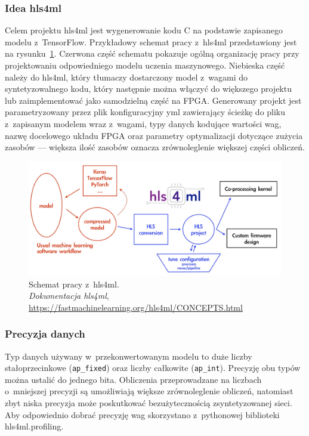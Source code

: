 \documentclass[12pt, oneside, a4paper]{article}
\def\CPP{{C\nolinebreak[4]\hspace{-.05em}\raisebox{.4ex}{\tiny\bf ++}}}
\begin{document}
\subsubsection{Idea hls4ml}
Celem projektu hls4ml jest wygenerowanie kodu \CPP{} na podstawie zapisanego
modelu z~TensorFlow. Przykładowy schemat pracy z~hls4ml przedstawiony jest
na rysunku~\ref{fig:hls4ml}.
Czerwona część schematu pokazuje ogólną organizację pracy przy projektowaniu 
odpowiedniego modelu uczenia maszynowego. Niebieska część należy do hls4ml,
który tłumaczy dostarczony model z~wagami do syntetyzowalnego kodu, który
następnie można włączyć do większego projektu lub zaimplementować jako
samodzielną część na FPGA. Generowany projekt jest parametryzowany
przez plik konfiguracyjny yml zawierający ścieżkę do pliku z~zapisanym modelem
wraz z~wagami, typy danych kodujące wartości wag, nazwę docelowego układu FPGA
oraz parametry optymalizacji dotyczące zużycia zasobów --- większa ilość
zasobów oznacza zrównoleglenie większej części obliczeń.
\begin{figure}[h]
  \centering
  \includegraphics[width=\linewidth]{figures/hls4ml.jpg}
  \caption{Schemat pracy z~hls4ml. \\
  \textit{Dokumentacja hls4ml},
  \url{https://fastmachinelearning.org/hls4ml/CONCEPTS.html}}\label{fig:hls4ml}
\end{figure}

\subsubsection{Precyzja danych}
Typ danych używany w~przekonwertowanym modelu to duże liczby
stałoprzecinkowe (\lstinline{ap_fixed}) oraz liczby całkowite
(\lstinline{ap_int}).
Precyzję obu typów można ustalić do jednego bita.
Obliczenia przeprowadzane na liczbach o~mniejszej
precyzji są umożliwiają większe zrównoleglenie obliczeń,
natomiast zbyt niska precyzja może poskutkować
bezużytecznością zsyntetyzowanej sieci. Aby odpowiednio dobrać precyzję
wag skorzystano z~pythonowej biblioteki hls4ml.profiling.
\end{document}
